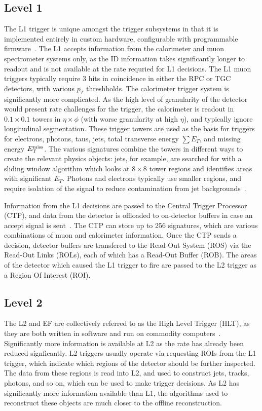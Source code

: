 \subsection{Level 1}

The L1 trigger is unique amongst the trigger subsystems in that it is implemented entirely in custom hardware, configurable with programmable firmware~\cite{ATLASPaper,Trigger2010}. The L1 accepts information from the calorimeter and muon spectrometer systems only, as the ID information takes significantly longer to readout and is not available at the rate requried for L1 decisions.  The L1 muon triggers typically require 3 hits in coincidence in either the RPC or TGC detectors, with various $p_T$ threshholds. The calorimeter trigger system is significantly more complicated. As the high level of granularity of the detector would present rate challenges for the trigger, the calorimeter is readout in $0.1\times0.1$ towers in $\eta \times \phi$ (with worse granularity at high $\eta$), and typically ignore longitudinal segmentation. These trigger towers are used as the basis for triggers for electrons, photons, taus, jets, total transverse energy $\sum E_T$, and missing energy $E_{\mathrm{T}}^{\text{miss}}$. The various signatures combine the towers in different ways to create the relevant physics objects: jets, for example, are searched for with a sliding window algorithm which looks at $8\times 8$ tower regions and identifies areas with significant $E_T$. Photons and electrons typically use smaller regions, and require isolation of the signal to reduce contamination from jet backgrounds~\cite{Trigger2010}.

Information from the L1 decisions are passed to the Central Trigger Processor (CTP), and data from the detector is offloaded to on-detector buffers in case an accept signal is sent~\cite{ATLASPaper}. The CTP can store up to 256 signatures, which are various combinations of muon and calorimeter information. Once the CTP sends a decision, detector buffers are transfered to the Read-Out System (ROS) via the Read-Out Links (ROLs), each of which has a Read-Out Buffer (ROB). The areas of the detector which caused the L1 trigger to fire are passed to the L2 trigger as a Region Of Interest (ROI).

\subsection{Level 2}

The L2 and EF are collectively referred to as the High Level Trigger (HLT), as they are both written in software and run on commodity computers~\cite{ATLASPaper}. Significantly more information is available at L2 as the rate has already been reduced signficantly. L2 triggers usually operate via requesting ROIs from the L1 trigger, which indicate which regions of the detector should be further inspected. The data from these regions is read into L2, and used to construct jets, tracks, photons, and so on, which can be used to make trigger decisions. As L2 has significantly more information available than L1, the algorithms used to reconstruct these objects are much closer to the offline reconstruction.

